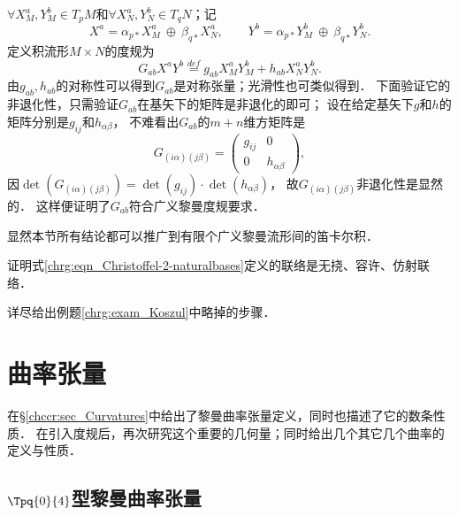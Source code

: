 $\forall X_M^a, Y_M^b \in T_p M$和$\forall X_N^a, Y_N^b \in T_q N$；记
\begin{equation}
    X^a=\alpha_{p*} X_M^a \ \oplus\ \beta_{q*}  X_N^a, \qquad Y^b=\alpha_{p*} Y_M^b \ \oplus\ \beta_{q*}  Y_N^b .
\end{equation}
定义积流形$M\times N$的度规为
\begin{equation}\label{chrg:eqn_metric-product}
    G_{ab}X^a Y^b \overset{def}{=} g_{ab}X^a_M Y^b_M + h_{ab}X^a_N Y^b_N .
\end{equation}
由$g_{ab},h_{ab}$的对称性可以得到$G_{ab}$是对称张量；光滑性也可类似得到．
下面验证它的非退化性，只需验证$G_{ab}$在基矢下的矩阵是非退化的即可；
设在给定基矢下$g$和$h$的矩阵分别是$g_{ij}$和$h_{\alpha\beta}$，
不难看出$G_{ab}$的$m+n$维方矩阵是
\begin{equation}
    G_{(i\alpha)(j\beta)}=\begin{pmatrix}
        g_{ij} & 0 \\ 0 & h_{\alpha\beta}
    \end{pmatrix},
\end{equation}
因$\det(G_{(i\alpha)(j\beta)})=\det(g_{ij}) \cdot \det(h_{\alpha\beta})$，
故$G_{(i\alpha)(j\beta)}$非退化性是显然的．
这样便证明了$G_{ab}$符合广义黎曼度规要求．


显然本节所有结论都可以推广到有限个广义黎曼流形间的笛卡尔积．

\begin{exercise}
	证明式\eqref{chrg:eqn_Christoffel-2-naturalbases}定义的联络是无挠、容许、仿射联络．
\end{exercise}


\begin{exercise}
	详尽给出例题\ref{chrg:exam_Koszul}中略掉的步骤．
\end{exercise}



\section{曲率张量}
在\S \ref{chccr:sec_Curvatures}中给出了黎曼曲率张量定义，同时也描述了它的数条性质．
在引入度规后，再次研究这个重要的几何量；同时给出几个其它几个曲率的定义与性质．

\subsection{$\Tpq{0}{4}$型黎曼曲率张量}\label{chrg:sec_R04}

